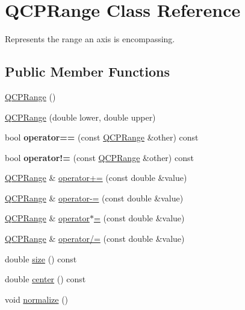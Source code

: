 \hypertarget{classQCPRange}{}\section{Q\+C\+P\+Range Class Reference}
\label{classQCPRange}


Represents the range an axis is encompassing.  


\subsection*{Public Member Functions}
\begin{DoxyCompactItemize}
\item 
\hyperlink{classQCPRange_aca158d7e69702cee5d77d10a269b01e2}{Q\+C\+P\+Range} ()
\item 
\hyperlink{classQCPRange_a1d9d84d084c8f368fdedd42e0978d405}{Q\+C\+P\+Range} (double lower, double upper)
\item 
\mbox{\label{classQCPRange_a9f8d1fdcf4b6d19779f1c3d9a14b09c9}} 
bool {\bfseries operator==} (const \hyperlink{classQCPRange}{Q\+C\+P\+Range} \&other) const
\item 
\mbox{\label{classQCPRange_a4827a37c83b8bb4bf53fcf8f6a257e77}} 
bool {\bfseries operator!=} (const \hyperlink{classQCPRange}{Q\+C\+P\+Range} \&other) const
\item 
\hyperlink{classQCPRange}{Q\+C\+P\+Range} \& \hyperlink{classQCPRange_afea7c1aa7d08f061cd9bd8832f957df8}{operator+=} (const double \&value)
\item 
\hyperlink{classQCPRange}{Q\+C\+P\+Range} \& \hyperlink{classQCPRange_a95894bcb15a16a75ca564091374e2191}{operator-\/=} (const double \&value)
\item 
\hyperlink{classQCPRange}{Q\+C\+P\+Range} \& \hyperlink{classQCPRange_a6876aa9620ff2f0f7f1873f998372cef}{operator$\ast$=} (const double \&value)
\item 
\hyperlink{classQCPRange}{Q\+C\+P\+Range} \& \hyperlink{classQCPRange_a6137d8682b6835ace840730b4c1e2d63}{operator/=} (const double \&value)
\item 
double \hyperlink{classQCPRange_a62326e7cc4316b96df6a60813230e63f}{size} () const
\item 
double \hyperlink{classQCPRange_af57d4a37a45d0101177ca30fae5d4ca8}{center} () const
\item 
void \hyperlink{classQCPRange_af914a7740269b0604d0827c634a878a9}{normalize} ()

\end{DoxyCompactItemize}
